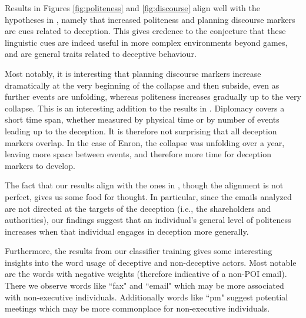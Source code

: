

Results in Figures \ref{fig:politeness} and \ref{fig:discourse} align well with the hypotheses in \cite{diplomacy}, namely that increased politeness and planning discourse markers are cues related to deception. This gives credence to the conjecture that these linguistic cues are indeed useful in more complex environments beyond games, and are general traits related to deceptive behaviour.

Most notably, it is interesting that planning discourse markers increase dramatically at the very beginning of the collapse and then subside, even as further events are unfolding, whereas politeness increases gradually up to the very collapse. This is an interesting addition to the results in \cite{diplomacy}. Diplomacy covers a short time span, whether measured by physical time or by number of events leading up to the deception. It is therefore not surprising that all deception markers overlap. In the case of Enron, the collapse was unfolding over a year, leaving more space between events, and therefore more time for deception markers to develop. %

The fact that our results align with the ones in \cite{diplomacy}, though the alignment is not perfect, gives us some food for thought. %
In particular, since the emails analyzed are not directed at the targets of the deception (i.e., the shareholders and authorities), our findings suggest that an individual's general level of politeness increases when that individual engages in deception more generally. 

Furthermore, the results from our classifier training gives some interesting insights into the word usage of deceptive and non-deceptive actors. Most notable are the words with negative weights (therefore indicative of a non-POI email). There we observe words like ``fax" and ``email" which may be more associated with non-executive individuals. Additionally words like ``pm" suggest potential meetings which may be more commonplace for non-executive individuals.

